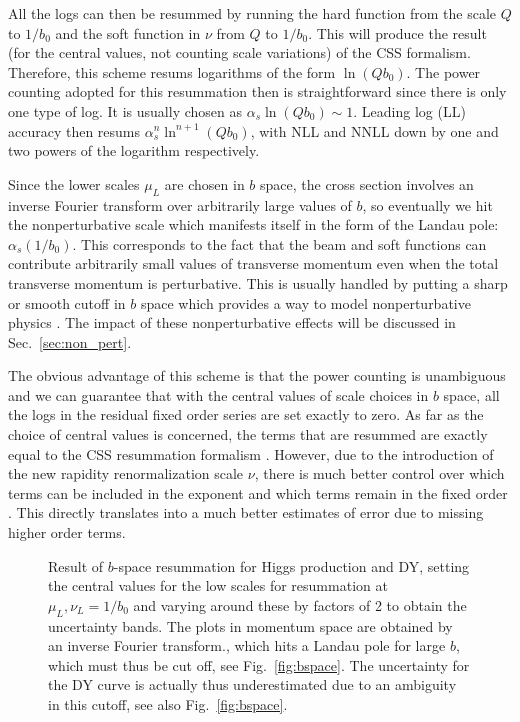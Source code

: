 \documentclass[a4,letterpaper,11pt]{article}
\renewcommand{\sec}[1]{Sec.~\ref{sec:#1}}
\newcommand{\fig}[1]{Fig.~\ref{fig:#1}}
\begin{document}
All the logs can then be resummed by running the hard function from the scale $Q$ to $1/b_0$ and the soft function in $\nu$ from $Q$ to $1/b_0$. This will produce the result (for the central values, not counting scale variations) of the CSS formalism. Therefore, this scheme resums logarithms of the form $\ln( Q b_0)$. The power counting adopted for this resummation then is straightforward since there is only one type of log. It is usually chosen as $\alpha_s \ln(Q b_0) \sim 1$. Leading log (LL) accuracy  then resums $\alpha_s^n \ln^{n+1}(Q b_0)$, with NLL and NNLL down by one and two powers of the logarithm respectively.

Since the lower scales $\mu_L$ are chosen in $b$ space, the cross section involves an inverse Fourier transform over arbitrarily large values of $b$, so  eventually we hit the nonperturbative scale which manifests itself in the form of the Landau pole: $\alpha_s(1/b_0)$. This corresponds to the fact that the beam and soft functions can contribute arbitrarily small values of transverse momentum even when the total transverse momentum is perturbative. This is usually handled by putting a sharp or smooth cutoff in $b$ space which provides a way to model nonperturbative physics \cite{Qiu:2000hf,Sun:2013dya,DAlesio:2014mrz,Collins:2014jpa,Scimemi:2017etj}. The impact of these nonperturbative effects will be discussed in \sec{non_pert}.

The obvious advantage of this scheme is that the power counting is unambiguous and we can guarantee that with the central values of scale choices in $b$ space, all the logs in the residual fixed order series are set exactly to zero.
As far as the choice of central values is concerned, the terms that are resummed are exactly equal to the CSS resummation formalism \cite{Collins:1984kg}. However, due to the introduction of the new rapidity renormalization scale $\nu$, there is much better control over which terms can be included in the exponent and which terms remain in the fixed order \cite{Chiu:2012ir,Chiu:2011qc}. This directly translates into a much better estimates of error due to missing higher order terms.

\begin{figure}
\centerline{}
\vskip-0.2cm
\caption[1]{Result of $b$-space resummation for Higgs production and DY, setting the central values for the low scales for resummation at $\mu_L,\nu_L = 1/b_0$ and varying around these by factors of 2 to obtain the uncertainty bands. The plots in momentum space are obtained by an inverse Fourier transform., which hits a Landau pole for large $b$, which must thus be cut off, see \fig{bspace}. The uncertainty for the DY curve is actually thus underestimated due to an ambiguity in this cutoff, see also \fig{bspace}.}
\label{fig:bspaceresum} 
\end{figure}
\end{document}
